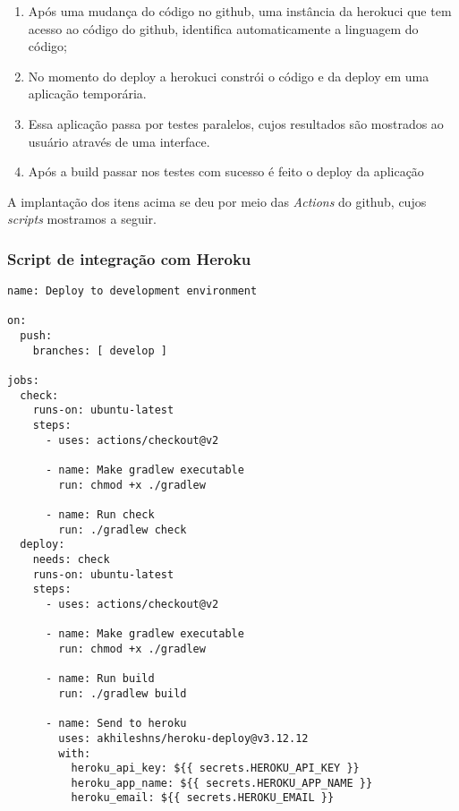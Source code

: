 \begin{enumerate}
    \item Após uma mudança do código no \gls{github}, uma instância da \gls{herokuci} que tem acesso ao código do \gls{github}, identifica automaticamente
    a linguagem do código; 
    \item No momento do \gls{deploy} a \gls{herokuci} constrói o código e da \gls{deploy} em uma aplicação temporária.
    \item Essa aplicação passa por testes paralelos, cujos resultados são mostrados ao usuário através de uma interface.
    \item Após a build passar nos testes com sucesso é feito o \gls{deploy} da aplicação 
\end{enumerate} 

A implantação dos itens acima se deu por meio das \emph{Actions} do \gls{github}, cujos \emph{scripts} mostramos a seguir.

\subsubsection{Script de integração com Heroku}
\begin{verbatim}
name: Deploy to development environment

on:
  push:
    branches: [ develop ]

jobs:
  check:
    runs-on: ubuntu-latest
    steps:
      - uses: actions/checkout@v2
      
      - name: Make gradlew executable
        run: chmod +x ./gradlew

      - name: Run check
        run: ./gradlew check
  deploy:
    needs: check
    runs-on: ubuntu-latest
    steps:
      - uses: actions/checkout@v2
      
      - name: Make gradlew executable
        run: chmod +x ./gradlew

      - name: Run build
        run: ./gradlew build

      - name: Send to heroku
        uses: akhileshns/heroku-deploy@v3.12.12
        with:
          heroku_api_key: ${{ secrets.HEROKU_API_KEY }}
          heroku_app_name: ${{ secrets.HEROKU_APP_NAME }}
          heroku_email: ${{ secrets.HEROKU_EMAIL }}
\end{verbatim}

